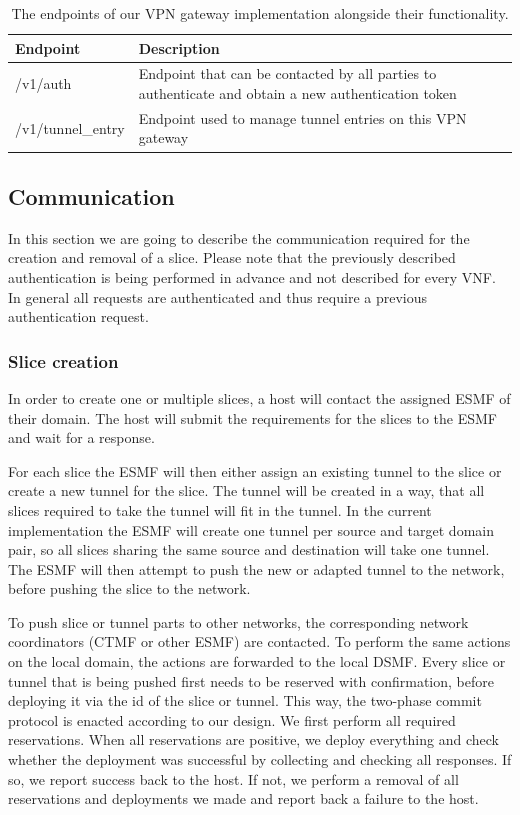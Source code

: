 \begin{table}[htp]
    \begin{tabularx}{\textwidth}{ |l|X| }
        \hline
        \textbf{Endpoint} & \textbf{Description} \\
        \hline
         /v1/auth & Endpoint that can be contacted by all parties to authenticate and obtain a new authentication token \\
        \hline
         /v1/tunnel\_entry & Endpoint used to manage tunnel entries on this VPN gateway \\
        \hline
    \end{tabularx}
    \caption[VPN gateway endpoints]{The endpoints of our VPN gateway implementation alongside their functionality.}
    \label{table:vpn_gateway}
\end{table}

\subsection{Communication}
\label{impl_communication}
In this section we are going to describe the communication required for the creation and removal of a slice. Please note that the previously described authentication is being performed in advance and not described for every VNF. In general all requests are authenticated and thus require a previous authentication request.

\subsubsection{Slice creation}
In order to create one or multiple slices, a host will contact the assigned ESMF of their domain. The host will submit the requirements for the slices to the ESMF and wait for a response.

For each slice the ESMF will then either assign an existing tunnel to the slice or create a new tunnel for the slice. The tunnel will be created in a way, that all slices required to take the tunnel will fit in the tunnel. In the current implementation the ESMF will create one tunnel per source and target domain pair, so all slices sharing the same source and destination will take one tunnel. The ESMF will then attempt to push the new or adapted tunnel to the network, before pushing the slice to the network.

To push slice or tunnel parts to other networks, the corresponding network coordinators (CTMF or other ESMF) are contacted. To perform the same actions on the local domain, the actions are forwarded to the local DSMF. Every slice or tunnel that is being pushed first needs to be reserved with confirmation, before deploying it via the id of the slice or tunnel. This way, the two-phase commit protocol is enacted according to our design. We first perform all required reservations. When all reservations are positive, we deploy everything and check whether the deployment was successful by collecting and checking all responses. If so, we report success back to the host. If not, we perform a removal of all reservations and deployments we made and report back a failure to the host.


